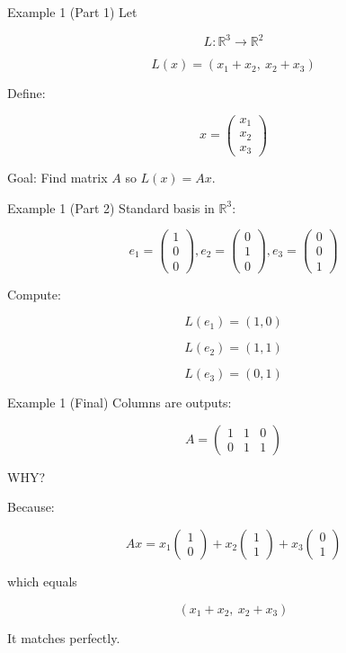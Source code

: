 \documentclass[aspectratio=169]{beamer}
\begin{document}
\begin{frame}{Example 1 (Part 1)}
Let

\[
L: \mathbb{R}^3 \to \mathbb{R}^2
\]

\[
L(x) = (x_1 + x_2,\ x_2 + x_3)
\]

Define:

\[
x =
\begin{pmatrix}
x_1\\
x_2\\
x_3
\end{pmatrix}
\]

Goal: Find matrix \(A\) so \(L(x)=Ax\).

\end{frame}

\begin{frame}{Example 1 (Part 2)}
Standard basis in \( \mathbb{R}^3 \):

\[
e_1 =
\begin{pmatrix}1\\0\\0\end{pmatrix},
e_2 =
\begin{pmatrix}0\\1\\0\end{pmatrix},
e_3 =
\begin{pmatrix}0\\0\\1\end{pmatrix}
\]

Compute:

\[
L(e_1) = (1,0)
\]

\[
L(e_2) = (1,1)
\]

\[
L(e_3) = (0,1)
\]

\end{frame}

\begin{frame}{Example 1 (Final)}
Columns are outputs:

\[
A =
\begin{pmatrix}
1 & 1 & 0\\
0 & 1 & 1
\end{pmatrix}
\]

WHY?

Because:

\[
Ax =
x_1
\begin{pmatrix}1\\0\end{pmatrix}
+
x_2
\begin{pmatrix}1\\1\end{pmatrix}
+
x_3
\begin{pmatrix}0\\1\end{pmatrix}
\]

which equals

\[
(x_1 + x_2,\ x_2 + x_3)
\]

It matches perfectly.
\end{frame}
\end{document}
